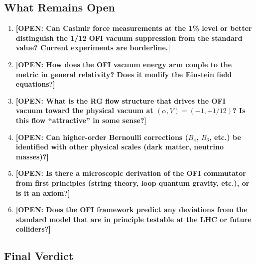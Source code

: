 \documentclass[12pt]{article}
\theoremstyle{definition}
\newcommand{\OPEN}[1]{\textcolor{opencolor}{\textbf{[OPEN: #1]}}}
\begin{document}
\subsection{What Remains Open}

\begin{enumerate}
  \item \OPEN{Can Casimir force measurements at the 1\% level or better distinguish
    the 1/12 OFI vacuum suppression from the standard value? Current experiments
    are borderline.}

  \item \OPEN{How does the OFI vacuum energy arm couple to the metric in general
    relativity? Does it modify the Einstein field equations?}

  \item \OPEN{What is the RG flow structure that drives the OFI vacuum toward the
    physical vacuum at $(\alpha, V) = (-1, +1/12)$? Is this flow ``attractive'' in
    some sense?}

  \item \OPEN{Can higher-order Bernoulli corrections ($B_4$, $B_6$, etc.) be
    identified with other physical scales (dark matter, neutrino masses)?}

  \item \OPEN{Is there a microscopic derivation of the OFI commutator from first
    principles (string theory, loop quantum gravity, etc.), or is it an axiom?}

  \item \OPEN{Does the OFI framework predict any deviations from the standard model
    that are in principle testable at the LHC or future colliders?}
\end{enumerate}

\subsection{Final Verdict}
\end{document}
